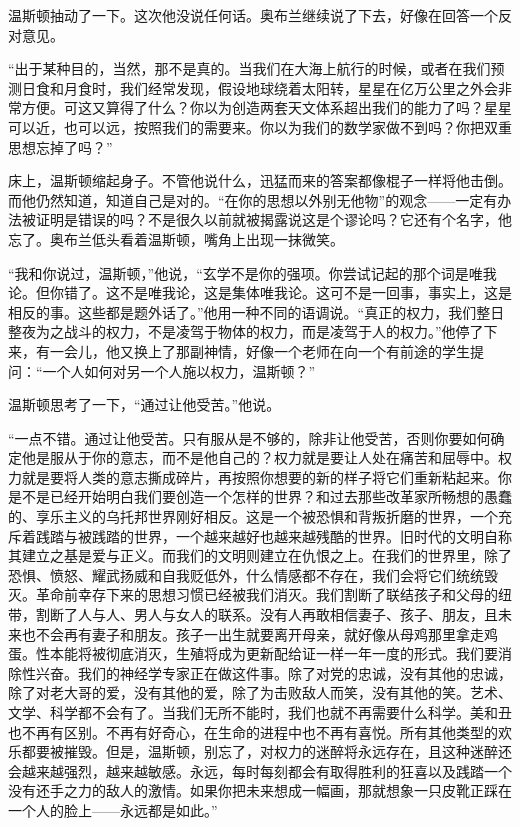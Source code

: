 温斯顿抽动了一下。这次他没说任何话。奥布兰继续说了下去，好像在回答一个反对意见。

``出于某种目的，当然，那不是真的。当我们在大海上航行的时候，或者在我们预测日食和月食时，我们经常发现，假设地球绕着太阳转，星星在亿万公里之外会非常方便。可这又算得了什么？你以为创造两套天文体系超出我们的能力了吗？星星可以近，也可以远，按照我们的需要来。你以为我们的数学家做不到吗？你把双重思想忘掉了吗？''

床上，温斯顿缩起身子。不管他说什么，迅猛而来的答案都像棍子一样将他击倒。而他仍然知道，知道自己是对的。``在你的思想以外别无他物''的观念——一定有办法被证明是错误的吗？不是很久以前就被揭露说这是个谬论吗？它还有个名字，他忘了。奥布兰低头看着温斯顿，嘴角上出现一抹微笑。

``我和你说过，温斯顿，''他说，``玄学不是你的强项。你尝试记起的那个词是唯我论。但你错了。这不是唯我论，这是集体唯我论。这可不是一回事，事实上，这是相反的事。这些都是题外话了。''他用一种不同的语调说。``真正的权力，我们整日整夜为之战斗的权力，不是凌驾于物体的权力，而是凌驾于人的权力。''他停了下来，有一会儿，他又换上了那副神情，好像一个老师在向一个有前途的学生提问：``一个人如何对另一个人施以权力，温斯顿？''

温斯顿思考了一下，``通过让他受苦。''他说。

``一点不错。通过让他受苦。只有服从是不够的，除非让他受苦，否则你要如何确定他是服从于你的意志，而不是他自己的？权力就是要让人处在痛苦和屈辱中。权力就是要将人类的意志撕成碎片，再按照你想要的新的样子将它们重新粘起来。你是不是已经开始明白我们要创造一个怎样的世界？和过去那些改革家所畅想的愚蠢的、享乐主义的乌托邦世界刚好相反。这是一个被恐惧和背叛折磨的世界，一个充斥着践踏与被践踏的世界，一个越来越好也越来越残酷的世界。旧时代的文明自称其建立之基是爱与正义。而我们的文明则建立在仇恨之上。在我们的世界里，除了恐惧、愤怒、耀武扬威和自我贬低外，什么情感都不存在，我们会将它们统统毁灭。革命前幸存下来的思想习惯已经被我们消灭。我们割断了联结孩子和父母的纽带，割断了人与人、男人与女人的联系。没有人再敢相信妻子、孩子、朋友，且未来也不会再有妻子和朋友。孩子一出生就要离开母亲，就好像从母鸡那里拿走鸡蛋。性本能将被彻底消灭，生殖将成为更新配给证一样一年一度的形式。我们要消除性兴奋。我们的神经学专家正在做这件事。除了对党的忠诚，没有其他的忠诚，除了对老大哥的爱，没有其他的爱，除了为击败敌人而笑，没有其他的笑。艺术、文学、科学都不会有了。当我们无所不能时，我们也就不再需要什么科学。美和丑也不再有区别。不再有好奇心，在生命的进程中也不再有喜悦。所有其他类型的欢乐都要被摧毁。但是，温斯顿，别忘了，对权力的迷醉将永远存在，且这种迷醉还会越来越强烈，越来越敏感。永远，每时每刻都会有取得胜利的狂喜以及践踏一个没有还手之力的敌人的激情。如果你把未来想成一幅画，那就想象一只皮靴正踩在一个人的脸上——永远都是如此。''

